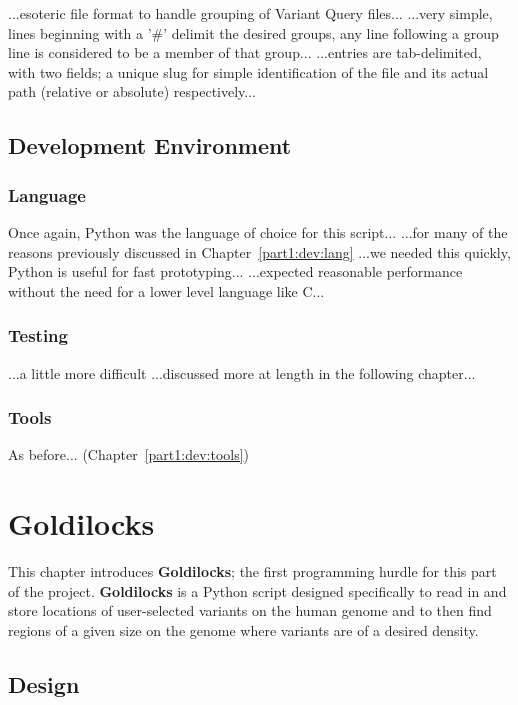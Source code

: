 ...esoteric file format to handle grouping of Variant Query files...
...very simple, lines beginning with a '\#' delimit the desired groups, any line
following a group line is considered to be a member of that group...
...entries are tab-delimited, with two fields; a unique slug for simple
identification of the file and its actual path (relative or absolute)
respectively...


\section{Development Environment}
\subsection{Language}

Once again, Python was the language of choice for this script...
...for many of the reasons previously discussed in Chapter~\ref{part1:dev:lang}
...we needed this quickly, Python is useful for fast prototyping...
...expected reasonable performance without the need for a lower level language
like C...


\subsection{Testing}

...a little more difficult
...discussed more at length in the following chapter...


\subsection{Tools}

As before... (Chapter~\ref{part1:dev:tools})


\chapter{Goldilocks}

This chapter introduces \textbf{Goldilocks}; the first programming hurdle for
this part of the project. \textbf{Goldilocks} is a Python script designed
specifically to read in and store locations of user-selected variants on the
human genome and to then find regions of a given size on the genome where
variants are of a desired density.


\section{Design}
